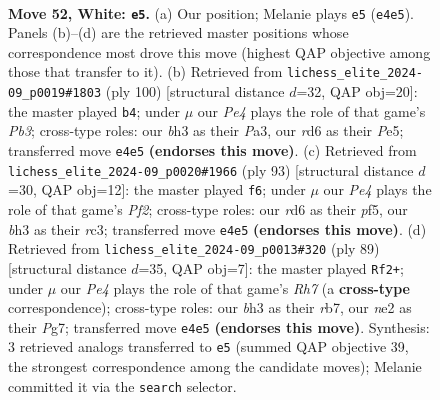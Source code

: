 \documentclass[11pt]{article}
\begin{document}
\clearpage

\begin{figure}[p]\centering
\begin{subfigure}{0.46\textwidth}\centering
\resizebox{\linewidth}{!}{%
\newchessgame
\chessboard[
  setfen={8/7p/3r1p2/6k1/1p2P1P1/4K2b/4n1r1/8 w - - 0 52},
  showmover=false,
  pgfstyle=straightmove, color=movearrow, markmove={e4-e5}
]}
\caption{}
\end{subfigure}\hfill
\begin{subfigure}{0.46\textwidth}\centering
\resizebox{\linewidth}{!}{%
\newchessgame
\chessboard[
  setfen={3r2k1/5pp1/8/4P3/7p/PPKn3P/8/8 w - - 0 51},
  showmover=false,
  pgfstyle=straightmove, color=movearrow, markmove={b3-b4}
]}
\caption{}
\end{subfigure}
\\[4pt]
\begin{subfigure}{0.46\textwidth}\centering
\resizebox{\linewidth}{!}{%
\newchessgame
\chessboard[
  setfen={8/1k3p2/1p6/2pK1P2/8/2R2P2/2P1r3/8 b - - 3 47},
  showmover=false,
  pgfstyle=straightmove, color=movearrow, markmove={f7-f6}
]}
\caption{}
\end{subfigure}\hfill
\begin{subfigure}{0.46\textwidth}\centering
\resizebox{\linewidth}{!}{%
\newchessgame
\chessboard[
  setfen={8/pR4p1/4k3/8/4BK2/2P5/PP5r/8 b - - 0 45},
  showmover=false,
  pgfstyle=straightmove, color=movearrow, markmove={h2-f2}
]}
\caption{}
\end{subfigure}
\caption{\textbf{Move 52, White: \texttt{e5}.} (a) Our position; Melanie plays \texttt{e5} (\texttt{e4e5}). Panels (b)--(d) are the retrieved master positions whose correspondence most drove this move (highest QAP objective among those that transfer to it). (b) Retrieved from \texttt{lichess\_elite\_2024-09\_p0019\#1803} (ply 100) [structural distance $d$=32, QAP obj=20]: the master played \texttt{b4}; under $\mu$ our \emph{Pe4} plays the role of that game's \emph{Pb3}; cross-type roles: our \emph{b}h3 as their \emph{P}a3, our \emph{r}d6 as their \emph{P}e5; transferred move \texttt{e4e5} \textbf{(endorses this move)}. (c) Retrieved from \texttt{lichess\_elite\_2024-09\_p0020\#1966} (ply 93) [structural distance $d$=30, QAP obj=12]: the master played \texttt{f6}; under $\mu$ our \emph{Pe4} plays the role of that game's \emph{Pf2}; cross-type roles: our \emph{r}d6 as their \emph{p}f5, our \emph{b}h3 as their \emph{r}c3; transferred move \texttt{e4e5} \textbf{(endorses this move)}. (d) Retrieved from \texttt{lichess\_elite\_2024-09\_p0013\#320} (ply 89) [structural distance $d$=35, QAP obj=7]: the master played \texttt{Rf2+}; under $\mu$ our \emph{Pe4} plays the role of that game's \emph{Rh7} (a \textbf{cross-type} correspondence); cross-type roles: our \emph{b}h3 as their \emph{r}b7, our \emph{n}e2 as their \emph{P}g7; transferred move \texttt{e4e5} \textbf{(endorses this move)}. Synthesis: 3 retrieved analogs transferred to \texttt{e5} (summed QAP objective 39, the strongest correspondence among the candidate moves); Melanie committed it via the \texttt{search} selector.}
\label{fig:thought-m102}
\end{figure}
\end{document}
